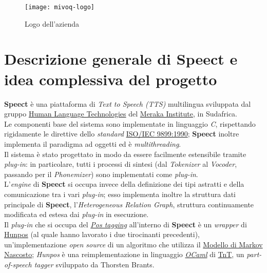 \begin{figure}[!h] 
    		\centering 
    		\texttt{[image: mivoq-logo]} 
   	 	\caption{Logo dell'azienda}
\end{figure}

\section{Descrizione generale di Speect e idea complessiva del progetto}
\textbf{Speect} è una piattaforma di \textit{Text to Speech (TTS)} multilingua sviluppata dal gruppo 
\href{http://www.meraka.org.za/humanLanguage.htm}{Human Language Technologies}
del \href{http://www.csir.co.za/meraka/}{Meraka Institute}, in Sudafrica. \\ Le componenti base del sistema sono implementate in linguaggio \textit{C}, rispettando
rigidamente le direttive dello \textit{standard} \href{http://www.dii.uchile.cl/~daespino/files/Iso_C_1999_definition.pdf}{ISO/IEC 9899:1990}; 
\textbf{Speect} inoltre implementa il paradigma ad oggetti ed è \textit{multithreading}. \\ Il sistema è stato progettato in modo da essere facilmente estensibile
tramite \textit{plug-in}: in particolare, tutti i processi di sintesi (dal \textit{Tokenizer} al \textit{Vocoder}, passando per il \textit{Phonemizer}) 
sono implementati come \textit{plug-in}. \\ L'\textit{engine} di \textbf{Speect}
si occupa invece della definizione dei tipi astratti e della comunicazione tra i vari \textit{plug-in}; esso implementa
inoltre la struttura dati principale di \textbf{Speect}, l'\textit{Heterogeneous Relation Graph}, struttura continuamente
modificata ed estesa dai \textit{plug-in} in esecuzione. \\
Il \textit{plug-in} che si occupa del \hyperref[glo:postag]{\emph{Pos tagging}\glsfirstoccur} all'interno di \textbf{Speect}
è un \textit{wrapper} di \href{https://github.com/mivoq/hunpos}{Hunpos} (al quale hanno lavorato i due tirocinanti
precedenti), un'implementazione \textit{open source} di un algoritmo
che utilizza il \href{https://en.wikipedia.org/wiki/Hidden_Markov_model}{Modello di Markov Nascosto}; \textit{Hunpos} è una 
reimplementazione in linguaggio \hyperref[glo:ocam]{\emph{OCaml}\glsfirstoccur} di 
\href{http://www.coli.uni-saarland.de/~thorsten/tnt/}{TnT}, un \textit{part-of-speech tagger} sviluppato da Thorsten Brants. \\

